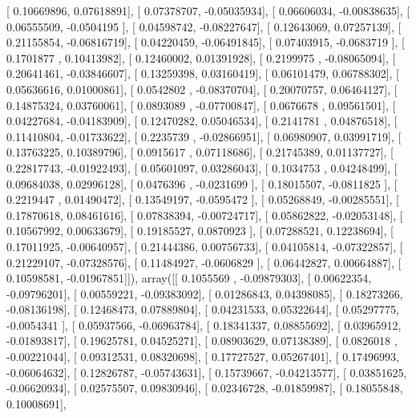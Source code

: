 \documentclass{article}
\begin{document}
       [ 0.10669896,  0.07618891],
       [ 0.07378707, -0.05035934],
       [ 0.06606034, -0.00838635],
       [ 0.06555509, -0.0504195 ],
       [ 0.04598742, -0.08227647],
       [ 0.12643069,  0.07257139],
       [ 0.21155854, -0.06816719],
       [ 0.04220459, -0.06491845],
       [ 0.07403915, -0.0683719 ],
       [ 0.1701877 ,  0.10413982],
       [ 0.12460002,  0.01391928],
       [ 0.2199975 , -0.08065094],
       [ 0.20641461, -0.03846607],
       [ 0.13259398,  0.03160419],
       [ 0.06101479,  0.06788302],
       [ 0.05636616,  0.01000861],
       [ 0.0542802 , -0.08370704],
       [ 0.20070757,  0.06464127],
       [ 0.14875324,  0.03760061],
       [ 0.0893089 , -0.07700847],
       [ 0.0676678 ,  0.09561501],
       [ 0.04227684, -0.04183909],
       [ 0.12470282,  0.05046534],
       [ 0.2141781 ,  0.04876518],
       [ 0.11410804, -0.01733622],
       [ 0.2235739 , -0.02866951],
       [ 0.06980907,  0.03991719],
       [ 0.13763225,  0.10389796],
       [ 0.0915617 ,  0.07118686],
       [ 0.21745389,  0.01137727],
       [ 0.22817743, -0.01922493],
       [ 0.05601097,  0.03286043],
       [ 0.1034753 ,  0.04248499],
       [ 0.09684038,  0.02996128],
       [ 0.0476396 , -0.0231699 ],
       [ 0.18015507, -0.0811825 ],
       [ 0.2219447 ,  0.01490472],
       [ 0.13549197, -0.0595472 ],
       [ 0.05268849, -0.00285551],
       [ 0.17870618,  0.08461616],
       [ 0.07838394, -0.00724717],
       [ 0.05862822, -0.02053148],
       [ 0.10567992,  0.00633679],
       [ 0.19185527,  0.0870923 ],
       [ 0.07288521,  0.12238694],
       [ 0.17011925, -0.00640957],
       [ 0.21444386,  0.00756733],
       [ 0.04105814, -0.07322857],
       [ 0.21229107, -0.07328576],
       [ 0.11484927, -0.0606829 ],
       [ 0.06442827,  0.00664887],
       [ 0.10598581, -0.01967851]]), array([[ 0.1055569 , -0.09879303],
       [ 0.00622354, -0.09796201],
       [ 0.00559221, -0.09383092],
       [ 0.01286843,  0.04398085],
       [ 0.18273266, -0.08136198],
       [ 0.12468473,  0.07889804],
       [ 0.04231533,  0.05322644],
       [ 0.05297775, -0.0054341 ],
       [ 0.05937566, -0.06963784],
       [ 0.18341337,  0.08855692],
       [ 0.03965912, -0.01893817],
       [ 0.19625781,  0.04525271],
       [ 0.08903629,  0.07138389],
       [ 0.0826018 , -0.00221044],
       [ 0.09312531,  0.08320698],
       [ 0.17727527,  0.05267401],
       [ 0.17496993, -0.06064632],
       [ 0.12826787, -0.05743631],
       [ 0.15739667, -0.04213577],
       [ 0.03851625, -0.06620934],
       [ 0.02575507,  0.09830946],
       [ 0.02346728, -0.01859987],
       [ 0.18055848,  0.10008691],
\end{document}
